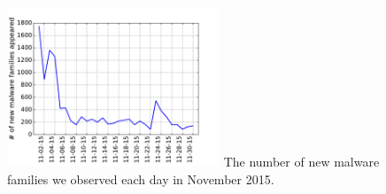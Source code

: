 \begin{figure}[t!]
\begin{center}
\includegraphics[width=2.5in]{figure/new_family}
{The number of new malware families we observed each day in November 2015.}
\end{center}
\end{figure}
